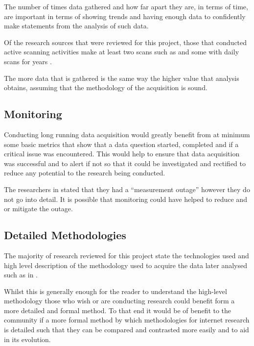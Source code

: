 \documentclass{mscreport}
\begin{document}
The number of times data gathered and how far apart they are, in terms of time, are important in terms of showing trends and having enough data to confidently make statements from the analysis of such data.

\vspace{0.3cm} \noindent
Of the research sources that were reviewed for this project, those that conducted active scanning activities make at least two scans such as \cite{Buchanan2018-xz,Amann2017-co,Chen2016-dl,Kumar2017-qw,} and some with daily scans for years \cite{Holz2020-ha}.

\vspace{0.3cm} \noindent
The more data that is gathered is the same way the higher value that analysis obtains, assuming that the methodology of the acquisition is sound.

\subsection{Monitoring}

Conducting long running data acquisition would greatly benefit from at minimum some basic metrics that show that a data question started, completed and if a critical issue was encountered. This would help to ensure that data acquisition was successful and to alert if not so that it could be investigated and rectified to reduce any potential to the research being conducted.

\vspace{0.3cm} \noindent
The researchers in \cite{Poteat2021-zr} stated that they had a “measurement outage” however they do not go into detail. It is possible that monitoring could have helped to reduce and or mitigate the outage.

\subsection{Detailed Methodologies}

The majority of research reviewed for this project state the technologies used and high level description of the methodology used to acquire the data later analysed such as in \cite{Amann2017-co,Chen2016-dl,Van_Goethem2014-ao}.

\vspace{0.3cm} \noindent
Whilst this is generally enough for the reader to understand the high-level methodology those who wish or are conducting research could benefit form a more detailed and formal method. To that end it would be of benefit to the community if a more formal method by which methodologies for internet research is detailed such that they can be compared and contrasted more easily and to aid in its evolution.
\end{document}
